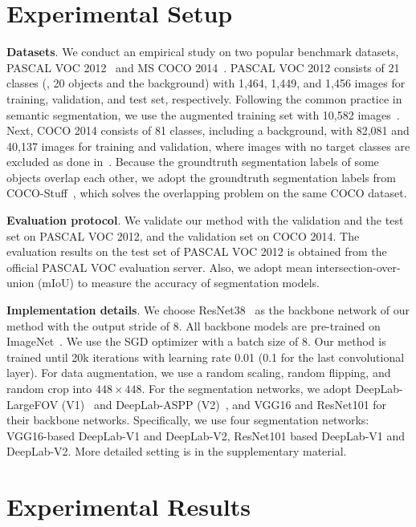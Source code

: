 \documentclass[final]{cvpr}
\begin{document}
\section{Experimental Setup}
\noindent
\textbf{Datasets}. We conduct an empirical study on two popular benchmark datasets, PASCAL VOC 2012~\cite{everingham2015pascal} and MS COCO 2014~\cite{lin2014microsoft}. PASCAL VOC 2012 consists of 21 classes (\ie, 20 objects and the background) with 1,464, 1,449, and 1,456 images for training, validation, and test set, respectively. Following the common practice in semantic segmentation, we use the augmented training set with 10,582 images~\cite{hariharan2011semantic}. Next, COCO 2014 consists of 81 classes, including a background, with 82,081 and 40,137 images for training and validation, where images with no target classes are excluded as done in~\cite{choe2020attention}. Because the groundtruth segmentation labels of some objects overlap each other, we adopt the groundtruth segmentation labels from COCO-Stuff~\cite{caesar2018coco}, which solves the overlapping problem on the same COCO dataset.

\vspace{0.5mm}
\noindent
\textbf{Evaluation protocol}. We validate our method with the validation and the test set on PASCAL VOC 2012, and the validation set on COCO 2014. The evaluation results on the test set of PASCAL VOC 2012 is obtained from the official PASCAL VOC evaluation server. Also, we adopt mean intersection-over-union (mIoU) to measure the accuracy of segmentation models.

\vspace{0.5mm}
\noindent
\textbf{Implementation details}. We choose ResNet38~\cite{wu2019wider} as the backbone network of our method with the output stride of 8. All backbone models are pre-trained on ImageNet~\cite{deng2009imagenet}. We use the SGD optimizer with a batch size of 8. Our method is trained until 20k iterations with learning rate 0.01 (0.1 for the last convolutional layer). For data augmentation, we use a random scaling, random flipping, and random crop into $448 \times 448$. For the segmentation networks, we adopt DeepLab-LargeFOV (V1)~\cite{chen2014semantic} and DeepLab-ASPP (V2)~\cite{chen2017deeplab}, and VGG16 and ResNet101 for their backbone networks. Specifically, we use four segmentation networks: VGG16-based DeepLab-V1 and DeepLab-V2, ResNet101 based DeepLab-V1 and DeepLab-V2. More detailed setting is in the supplementary material. 


\section{Experimental Results}
\end{document}
